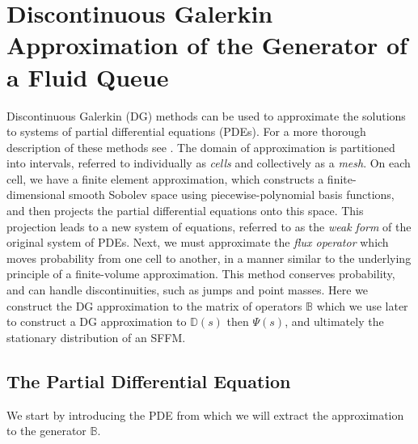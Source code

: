 \section{Discontinuous Galerkin Approximation of the Generator of a Fluid Queue}
	\label{sec:DG}
Discontinuous Galerkin (DG) methods can be used to approximate the solutions to systems of partial differential equations (PDEs). For a more thorough description of these methods see \citep{nodalDGBook}. The domain of approximation is partitioned into intervals, referred to individually as \textit{cells} and collectively as a \textit{mesh}. On each cell, we have a finite element approximation, which constructs a finite-dimensional smooth Sobolev space using piecewise-polynomial basis functions, and then projects the partial differential equations onto this space. This projection leads to a new system of equations, referred to as the \textit{weak form} of the original system of PDEs. Next, we must approximate the \textit{flux operator} which moves probability from one cell to another, in a manner similar to the underlying principle of a finite-volume approximation. This method conserves probability, and can handle discontinuities, such as jumps and point masses. Here we construct the DG approximation to the matrix of operators \(\mathbb B\) which we use later to construct a DG approximation to \(\mathbb D(s)\) then \(\mathbb\Psi(s)\), and ultimately the stationary distribution of an SFFM. 

\subsection{The Partial Differential Equation}
We start by introducing the PDE from which we will extract the approximation to the generator \(\mathbb B\). 

